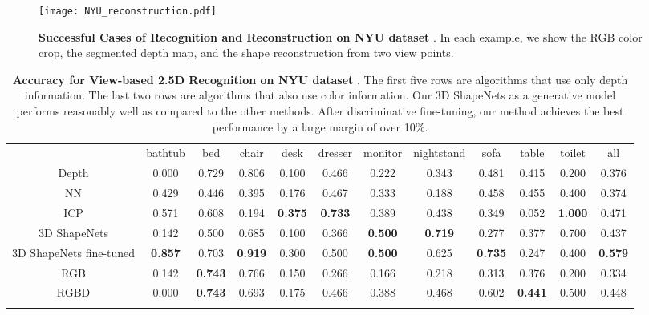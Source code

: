 \documentclass[10pt,twocolumn,letterpaper]{article}
\begin{document}
\begin{figure*}[t]
\texttt{[image: NYU\_reconstruction.pdf]}
\vspace{-5mm}
\caption{{\bf Successful Cases of Recognition and Reconstruction
on NYU dataset} \cite{NYUdataset}.
In each example, we show the RGB color crop, the segmented depth map, and the shape reconstruction from two view points.}
\label{fig:NYUvis}
\end{figure*}

\begin{table*}[t]
\centering
\setlength{\tabcolsep}{7.8pt}
{
\centering
\footnotesize
\begin{tabular}{c|c|c|c|c|c|c|c|c|c|c|c}
\Xhline{2\arrayrulewidth}
 & bathtub & bed & chair & desk & dresser & monitor & \hspace{-1mm}nightstand\hspace{-1mm} & sofa & table & toilet & all\tabularnewline
\Xhline{3\arrayrulewidth}
\cite{Socher} Depth & 0.000 & 0.729 & 0.806 & 0.100 & 0.466 & 0.222 & 0.343 & 0.481 & 0.415 & 0.200 & 0.376\tabularnewline
\hline 
NN & 0.429  & 0.446 & 0.395 & 0.176 & 0.467 & 0.333 & 0.188 & 0.458 & 0.455 & 0.400 & 0.374\tabularnewline
\hline 
ICP & 0.571  & 0.608 & 0.194 & {\bf 0.375} & {\bf 0.733} & 0.389 & 0.438 & 0.349 & 0.052 & {\bf 1.000} & 0.471\tabularnewline
\hline 
3D ShapeNets & 0.142  & 0.500 & 0.685 &0.100  & 0.366& {\bf 0.500} &  {\bf 0.719} &  0.277& 0.377 & 0.700 & 0.437 \tabularnewline
\hline 
3D ShapeNets fine-tuned & {\bf 0.857}  & 0.703 & {\bf 0.919} & 0.300  & 0.500 & {\bf 0.500} &  0.625 &  {\bf 0.735} & 0.247 & 0.400 & {\bf 0.579} \tabularnewline
\Xhline{3\arrayrulewidth}
\cite{Socher} RGB  & 0.142 & {\bf 0.743} & 0.766 & 0.150 & 0.266 & 0.166 & 0.218 & 0.313 & 0.376 & 0.200 & 0.334\tabularnewline
\hline 
\cite{Socher}  RGBD & 0.000 & {\bf 0.743} & 0.693 & 0.175 & 0.466 & 0.388 & 0.468 & 0.602 & {\bf 0.441} & 0.500 & 0.448\tabularnewline
\Xhline{2\arrayrulewidth}
\end{tabular}
}

\vspace*{-2mm}
\caption{{\bf Accuracy for View-based 2.5D Recognition on NYU dataset} \cite{NYUdataset}.
The first five rows are algorithms that use only depth information. 
The last two rows are algorithms that also use color information.
Our 3D ShapeNets as a generative model performs reasonably well as compared to the other methods. After discriminative fine-tuning, our method achieves the best performance by a large margin of over 10\%.
}
\label{table:ap}




\end{table*}
\end{document}
